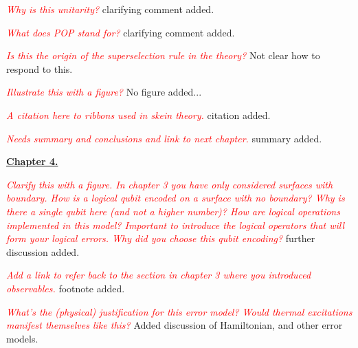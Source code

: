 \documentclass[11pt,oneside]{article}
\newcommand{\danbrowne}[1]{\vspace{10pt}\noindent\textcolor{red}{{\it #1}}}
\begin{document}
\danbrowne{Why is this unitarity?}
clarifying comment added.


\danbrowne{What does POP stand for?}
clarifying comment added.


\danbrowne{Is this the origin of the superselection rule in the theory?}
Not clear how to respond to this.


\danbrowne{Illustrate this with a figure?}
No figure added...


\danbrowne{A citation here to ribbons used in skein theory. }
citation added.


\danbrowne{Needs summary and conclusions and link to next chapter. }
summary added.

{\vspace{20pt}\noindent \bf \underline{Chapter 4.}}

\danbrowne{Clarify this with a figure. In chapter 3 you have only considered surfaces with boundary. How is a logical qubit encoded on a surface with no boundary?  Why is there a single qubit here (and not a higher number)?  How are logical operations implemented in this model? Important to introduce the logical operators that will form your logical errors.  Why did you choose this qubit encoding?}
further discussion added.


\danbrowne{Add a link to refer back to the section in chapter 3 where you introduced observables. }
footnote added.


\danbrowne{What's the (physical) justification for this error model? Would thermal excitations manifest themselves like this?}
Added discussion of Hamiltonian, and other error models.
\end{document}

